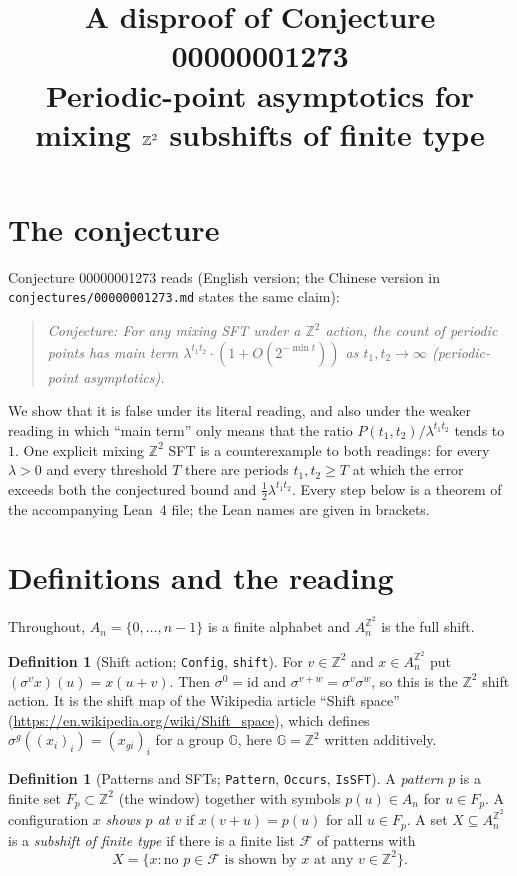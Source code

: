 \documentclass[11pt]{article}
\title{A disproof of Conjecture 00000001273\\[2pt]
\large Periodic-point asymptotics for mixing $\Z^2$ subshifts of finite type}
\date{}
\theoremstyle{definition}
\newtheorem{definition}[theorem]{Definition}
\theoremstyle{remark}
\renewcommand{\_}{\oldus\allowbreak}
\newcommand{\Z}{\mathbb{Z}}
\newcommand{\lean}[1]{\texttt{#1}}
\begin{document}
\sloppy
\maketitle

\section{The conjecture}

Conjecture 00000001273 reads (English version; the Chinese version in
\texttt{conjectures/00000001273.md} states the same claim):

\begin{quote}
\emph{Conjecture: For any mixing SFT under a $\Z^2$ action, the count of periodic points has main term
$\lambda^{t_1t_2}\cdot(1 + O(2^{-\min t}))$ as $t_1, t_2 \to \infty$ (periodic-point asymptotics).}
\end{quote}

We show that it is false under its literal reading, and also under the weaker reading in which ``main
term'' only means that the ratio $P(t_1,t_2)/\lambda^{t_1t_2}$ tends to $1$. One explicit mixing
$\Z^2$ SFT is a counterexample to both readings: for every $\lambda>0$ and every threshold $T$ there
are periods $t_1,t_2\ge T$ at which the error exceeds both the conjectured bound and $\tfrac12\lambda^{t_1t_2}$.
Every step below is a theorem of the accompanying Lean~4 file; the Lean names are given in brackets.

\section{Definitions and the reading}

Throughout, $A_n=\{0,\dots,n-1\}$ is a finite alphabet and $A_n^{\Z^2}$ is the full shift.

\begin{definition}[Shift action; \lean{Config}, \lean{shift}]
For $v\in\Z^2$ and $x\in A_n^{\Z^2}$ put $(\sigma^v x)(u)=x(u+v)$. Then $\sigma^0=\mathrm{id}$ and
$\sigma^{v+w}=\sigma^v\sigma^w$, so this is the $\Z^2$ shift action. It is the shift map of the
Wikipedia article ``Shift space'' (\url{https://en.wikipedia.org/wiki/Shift_space}), which defines
$\sigma^g((x_i)_i)=(x_{gi})_i$ for a group $\mathbb{G}$, here $\mathbb{G}=\Z^2$ written additively.
\end{definition}

\begin{definition}[Patterns and SFTs; \lean{Pattern}, \lean{Occurs}, \lean{IsSFT}]
A \emph{pattern} $p$ is a finite set $F_p\subset\Z^2$ (the window) together with symbols $p(u)\in A_n$
for $u\in F_p$. A configuration $x$ \emph{shows $p$ at $v$} if $x(v+u)=p(u)$ for all $u\in F_p$. A set
$X\subseteq A_n^{\Z^2}$ is a \emph{subshift of finite type} if there is a finite list $\mathcal F$ of
patterns with
\[
  X=\{x : \text{no } p\in\mathcal F \text{ is shown by } x \text{ at any } v\in\Z^2\}.
\]
\end{definition}
\end{document}
